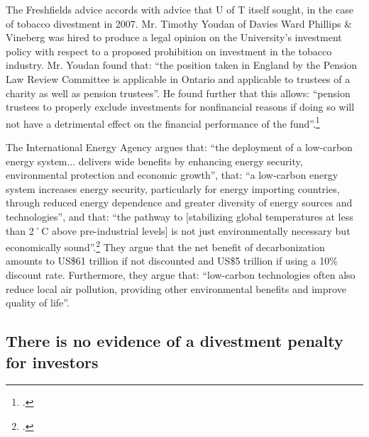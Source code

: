 The Freshfields advice accords with advice that U of T itself sought, in the case of tobacco divestment in 2007.
Mr. Timothy Youdan of Davies Ward Phillips \& Vineberg was hired to produce a legal opinion on the University's investment policy with respect to a proposed prohibition on investment in the tobacco 
industry.
Mr. Youdan found that: ``the position taken in England by the Pension Law Review Committee 
is applicable in Ontario and applicable to trustees of a charity as well as pension trustees''.
He found further that this allows: ``pension trustees to properly exclude investments for nonfinancial reasons if doing so will not have a detrimental effect on the financial performance of the fund''.\footcite[][p. 6]{TobaccoReport_2007}



The International Energy Agency argues that: ``the deployment of a low-carbon energy system... delivers wide benefits by enhancing energy security, environmental protection and economic growth'', that: ``a low-carbon energy system increases energy security, particularly for energy importing countries, through reduced energy dependence and greater diversity of energy sources and technologies'', and that: ``the pathway to [stabilizing global temperatures at less than 2˚C above pre-industrial levels] is not just environmentally necessary but economically sound''.\footcite[][]{IEAOnTwoDegrees}
They argue that the net benefit of decarbonization amounts to US\$61 trillion if not discounted and US\$5 trillion if using a 10\% discount rate.
Furthermore, they argue that: ``low-carbon technologies often also reduce local air pollution, providing other environmental benefits and improve quality of life''.



\subsection {There is no evidence of a divestment penalty for investors}
\label{NoDivestPenalty}



